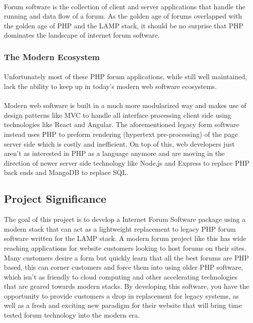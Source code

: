 \documentclass[]{article}
\begin{document}
\paragraph{}
Forum software is the collection of client and server applications that handle the running and data flow of a forum. As the golden age of forums overlapped with the golden age of PHP and the LAMP stack, it should be no surprise that PHP dominates the landscape of internet forum software. 
\subsubsection{The Modern Ecosystem}
\paragraph{}
Unfortunately most of these PHP forum applications, while still well maintained, lack the ability to keep up in today's modern web software ecosystems. 
\paragraph{}
Modern web software is built in a much more modularized way and makes use of design patterns like MVC to handle  all interface processing client side using technologies like React and Angular. The aforementioned legacy form software instead uses PHP to preform rendering (hypertext pre-processing) of the page server side which is costly and inefficient. On top of this, web developers just aren't as interested in PHP as a language anymore and are moving in the direction of newer server side technology like Node.js and Express to replace PHP back ends and MangoDB to replace SQL. 

\subsection{Project Significance}
The goal of this project is to develop a Internet Forum Software package using a modern stack that can act as a lightweight replacement to legacy PHP forum software written for the LAMP stack. A modern forum project like this has wide reaching applications for website customers looking to host forums on their sites. Many customers desire a form but quickly learn that all the best forums are PHP based, this can corner customers and force them into using older PHP software, which isn't as friendly to cloud computing and other accelerating technologies that are geared towards modern stacks. By developing this software, you have the opportunity to provide customers a drop in replacement for legacy systems, as well as a fresh and exciting new paradigm for their website that will bring time tested forum technology into the modern era. 
\end{document}
